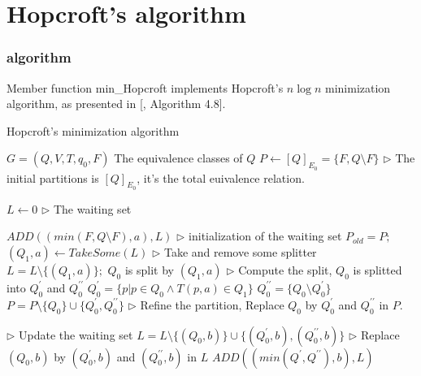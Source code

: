 \chapter{Hopcroft's algorithm}

\subsection{algorithm}

Member function min\_Hopcroft implements Hopcroft's $n\log n$ minimization algorithm, as presented in [\cite{WATSON94b}, Algorithm 4.8].

\begin{algorithm}  
	\caption{Hopcroft's minimization algorithm}  \label{alg:hopcroft}
	\begin{algorithmic}[1] %
		\Require $G =(Q,V,T,q_0,F)$  
		\Ensure The equivalence classes of $Q$  
		\State $P \gets [Q]_{E_0}=\{F,Q\setminus F \}$  \qquad\qquad $\triangleright$ The initial partitions is $[Q]_{E_0}$, it's the total euivalence relation.
		
		\State $L \gets 0$  \qquad\qquad $\triangleright$ The waiting set
		
			\State $ADD((min(F,Q\setminus F),a),L)$ \qquad\qquad 			$\triangleright$ initialization of the waiting set
		\EndFor
			\State $P_{old} = P;$
			\State $(Q_1,a)\gets TakeSome(L)$ \qquad\qquad $\triangleright$ Take and remove some splitter
			\State $L=L\setminus \{(Q_1,a)\};$
				\State $Q_0$ is split by $(Q_1,a)$  \qquad\qquad $\triangleright$ Compute the split, $Q_0$ is splitted into $Q_0^\prime$ and $Q_0^{\prime\prime}$
				\State $Q_0^{\prime}=\{p|p\in Q_0\land T(p,a)\in Q_1\}$ 
				\State $Q_0^{\prime\prime}=\{Q_0\setminus Q_0^\prime\}$
				\State $P=P\setminus \{Q_0\}\cup\{Q_0^\prime, Q_0^{\prime\prime}\}$ \qquad\qquad $\triangleright$ Refine the partition, Replace $Q_0$ by $Q_0^\prime$ and $Q_0^{\prime\prime}$ in $P$.
			
				  \qquad\qquad $\triangleright$ Update the waiting set
						\State $L=L\setminus \{(Q_0,b)\}\cup\{(Q_0^\prime,b),(Q_0^{\prime\prime},b)\} $ \qquad\qquad $\triangleright$ Replace $(Q_0, b)$ by $(Q_0^\prime, b)$ and $(Q_0^{\prime\prime}, b)$ in $L$
					\Else
						\State $ADD((min(Q^\prime,Q^{\prime\prime}),b),L)$
						\EndIf  
				\EndFor
			\EndFor 
		\EndWhile
	\end{algorithmic}
\end{algorithm}

